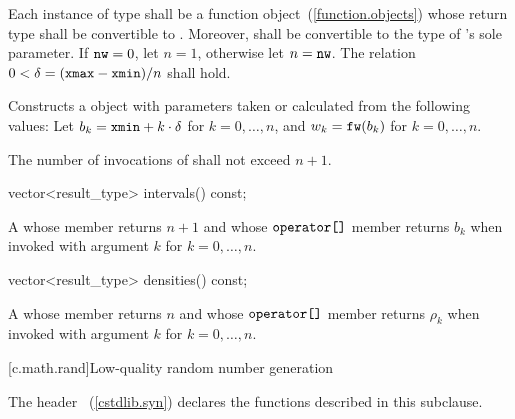 \begin{itemdescr}
\pnum\requires
 Each instance of type 
 shall be a function object~(\ref{function.objects})
 whose return type shall be convertible to .
 Moreover,
  shall be convertible
 to the type of 's sole parameter.
 If $ \texttt{nw} = 0 $, let $ n = 1 $, otherwise let $n = \texttt{nw}$.
 The relation $ 0 < \delta = (\texttt{xmax} - \texttt{xmin}) / n $
 shall hold.

\pnum\effects Constructs a  object
 with parameters taken or calculated
 from the following values:
 Let $ b_k = \texttt{xmin} + k \cdot \delta $ for $ k = 0, \ldots, n $,
 and $ w_k = \texttt{fw}(b_k) $ for $ k = 0, \ldots, n $.

\pnum\complexity
 The number of invocations of  shall not exceed $n+1$.
\end{itemdescr}

%
\begin{itemdecl}
vector<result_type> intervals() const;
\end{itemdecl}

\begin{itemdescr}
\pnum\returns A 
 whose  member returns $n + 1$
 and whose $ \texttt{operator[]} $ member returns $b_k$
 when invoked with argument $k$ for $k = 0, \ldots, n $.
\end{itemdescr}

%
\begin{itemdecl}
vector<result_type> densities() const;
\end{itemdecl}

\begin{itemdescr}
\pnum\returns A 
 whose  member returns $n$
 and whose $ \texttt{operator[]} $ member returns $\rho_k$
 when invoked with argument $k$ for $ k = 0, \ldots, n $.
\end{itemdescr}%
%
%
%
%

[c.math.rand]{Low-quality random number generation}

\pnum
{}%
%
\begin{note}
The header ~(\ref{cstdlib.syn})
declares the functions described in this subclause.
\end{note}

